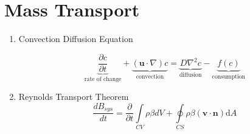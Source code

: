 \documentclass{article}
\begin{document}
\section{Mass Transport}
\begin{enumerate}
    \item Convection Diffusion Equation\\
    \begin{minipage}{0.5\textwidth}
    \[ \underbrace{\frac{\partial c}{\partial t}}_{\text{rate of change}} + \underbrace{(\mathbf{u} \cdot \nabla) c}_{\text{convection}} =  \underbrace{D \nabla^{2} c}_{\text{diffusion}} - \underbrace{f(c)}_{\text{consumption}} \] 
    \end{minipage}
    \begin{minipage}{0.4\textwidth}
    \begin{itemize}
    \end{itemize}
    \end{minipage}
    
    \item Reynolds Transport Theorem
    \[ \frac{dB_{sys}}{dt}=\frac{\partial}{\partial t}\int\limits_{CV}\rho \beta dV+\oint\limits_{CS}\rho\beta(\mathbf{v}\cdot\mathbf{n})\mathrm{d}A \]



\end{enumerate}
\vfill
{}
\end{document}
